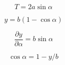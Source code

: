 \begin{equation}
T = 2a\sin\alpha 
\end{equation}

\begin{equation}
y = b(1 - \cos\alpha) 
\end{equation}

\begin{equation}
\frac{\partial y}{\partial \alpha} = b \sin\alpha
\end{equation}

\begin{equation}
\cos \alpha =1 - y/b 
\end{equation}















